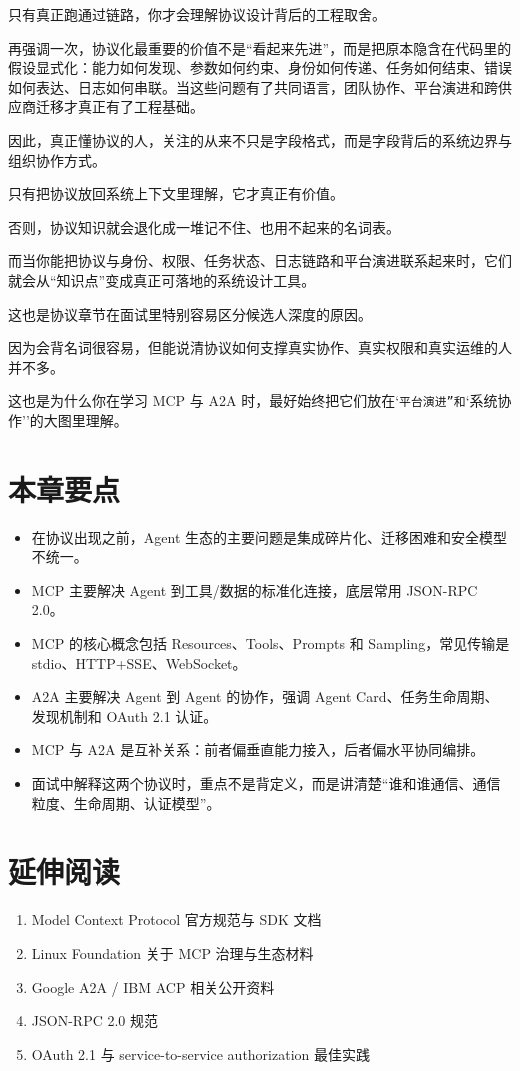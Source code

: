 只有真正跑通过链路，你才会理解协议设计背后的工程取舍。

再强调一次，协议化最重要的价值不是``看起来先进''，而是把原本隐含在代码里的假设显式化：能力如何发现、参数如何约束、身份如何传递、任务如何结束、错误如何表达、日志如何串联。当这些问题有了共同语言，团队协作、平台演进和跨供应商迁移才真正有了工程基础。

因此，真正懂协议的人，关注的从来不只是字段格式，而是字段背后的系统边界与组织协作方式。

只有把协议放回系统上下文里理解，它才真正有价值。

否则，协议知识就会退化成一堆记不住、也用不起来的名词表。

而当你能把协议与身份、权限、任务状态、日志链路和平台演进联系起来时，它们就会从``知识点''变成真正可落地的系统设计工具。

这也是协议章节在面试里特别容易区分候选人深度的原因。

因为会背名词很容易，但能说清协议如何支撑真实协作、真实权限和真实运维的人并不多。

这也是为什么你在学习 MCP 与 A2A 时，最好始终把它们放在`\texttt{平台演进''和}`系统协作''的大图里理解。


\section{本章要点}

\begin{itemize}[leftmargin=2em]
\item 在协议出现之前，Agent 生态的主要问题是集成碎片化、迁移困难和安全模型不统一。
\item MCP 主要解决 Agent 到工具/数据的标准化连接，底层常用 JSON-RPC 2.0。
\item MCP 的核心概念包括 Resources、Tools、Prompts 和 Sampling，常见传输是 stdio、HTTP+SSE、WebSocket。
\item A2A 主要解决 Agent 到 Agent 的协作，强调 Agent Card、任务生命周期、发现机制和 OAuth 2.1 认证。
\item MCP 与 A2A 是互补关系：前者偏垂直能力接入，后者偏水平协同编排。
\item 面试中解释这两个协议时，重点不是背定义，而是讲清楚``谁和谁通信、通信粒度、生命周期、认证模型''。
\end{itemize}

\section{延伸阅读}

\begin{enumerate}[leftmargin=2em]
\item Model Context Protocol 官方规范与 SDK 文档
\item Linux Foundation 关于 MCP 治理与生态材料
\item Google A2A / IBM ACP 相关公开资料
\item JSON-RPC 2.0 规范
\item OAuth 2.1 与 service-to-service authorization 最佳实践
\end{enumerate}
